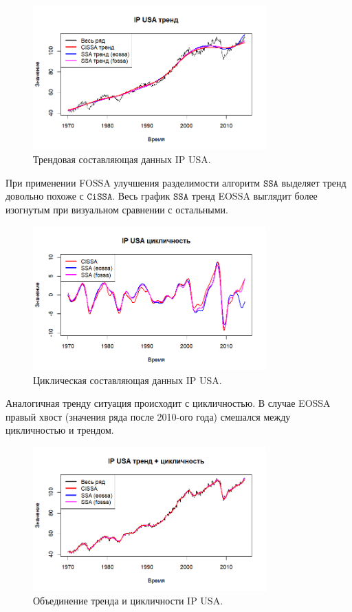 \documentclass[12pt, specialist, subf
]{disser}
\theoremstyle{definition}
\newcommand{\SSA}{\texttt{SSA}}
\newcommand{\CISSA}{\texttt{CiSSA}}
\begin{document}
\begin{figure}[H]
	\centering
	\includegraphics[width=0.8\textwidth]{img/trend inseparability example/IP_trend.png}
	\caption{Трендовая составляющая данных IP USA.}
	\label{fig:IP_trend}
\end{figure}

При применении FOSSA улучшения разделимости алгоритм $\SSA$ выделяет тренд довольно похоже с $\CISSA$. Весь график $\SSA$ тренд EOSSA выглядит более изогнутым при визуальном сравнении с остальными.

\begin{figure}[H]
	\centering
	\includegraphics[width=0.8\textwidth]{img/trend inseparability example/IP_cycle.png}
	\caption{Циклическая составляющая данных IP USA.}
	\label{fig:IP_cycle}
\end{figure}

Аналогичная тренду ситуация происходит с цикличностью. В случае EOSSA правый хвост (значения ряда после 2010-ого года) смешался между цикличностью и трендом.

\begin{figure}[H]
	\centering
	\includegraphics[width=0.8\textwidth]{img/trend inseparability example/IP_trend_sycle.png}
	\caption{Объединение тренда и цикличности IP USA.}
	\label{fig:IP_trend_sycle}
\end{figure}
\end{document}
